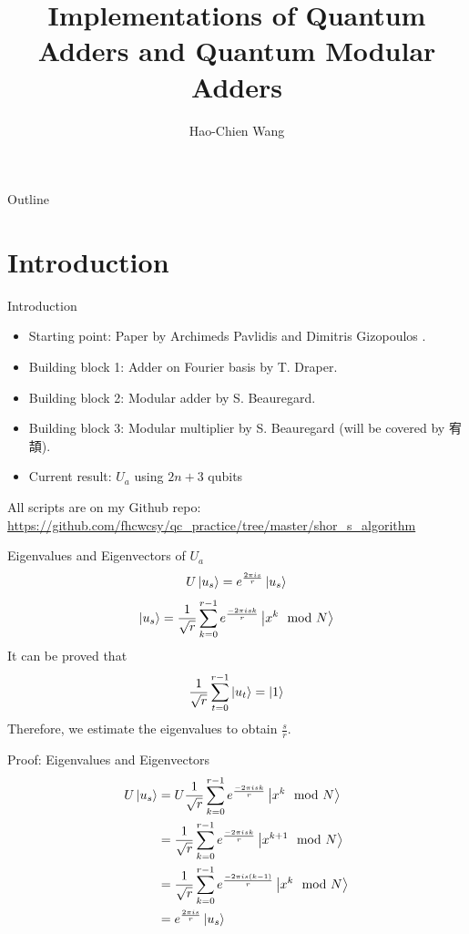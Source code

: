 \documentclass{beamer}
\title[Quantum Adder and Modular Adder]{Implementations of Quantum Adders and Quantum Modular Adders}
\author{Hao-Chien Wang}
\institute[NTUPhys]{Department of Physics, National Taiwan University}
\begin{document}
\begin{frame}
	\titlepage
\end{frame}

\begin{frame}{Outline}
	\tableofcontents
\end{frame}

\section{Introduction}%
\label{sec:introduction}

\begin{frame}{Introduction}
	\begin{itemize}
		\item Starting point: Paper by Archimeds Pavlidis and Dimitris Gizopoulos
			\cite{pavlidis}.
		\item Building block 1: Adder on Fourier basis by T. Draper\cite{draper}.
		\item Building block 2: Modular adder by S. Beauregard\cite{beauregard}.
		\item Building block 3: Modular multiplier by S. Beauregard\cite{beauregard} (will be covered by 宥頡).
		\item Current result: $U_a$ using $2n+3$ qubits
	\end{itemize}
	All scripts are on my Github repo: \\
	\scriptsize{\url{https://github.com/fhcwcsy/qc_practice/tree/master/shor_s_algorithm}}
\end{frame}


\begin{frame}{Eigenvalues and Eigenvectors of $U_a$}
	\begin{equation*}
		U \ket{u_s} = e^{\frac{2\pi i s}{r}} \ket{u_s}
	\end{equation*}
	\begin{equation*}
		\ket{u_s} = \frac{1}{\sqrt{r}} \sum_{k=0}^{r-1} 
		e^{\frac{-2\pi i sk}{r}} \ket{x^k \mod N}
	\end{equation*}
	It can be proved that
	\begin{equation*}
		\frac{1}{\sqrt{r}} \sum_{t=0}^{r-1} \ket{u_t} = \ket{1}
	\end{equation*}
	Therefore, we estimate the eigenvalues to obtain $\frac{s}{r}$.
\end{frame}

\begin{frame}{Proof: Eigenvalues and Eigenvectors}
	\begin{align*}
		U \ket{u_s} &= U \frac{1}{\sqrt{r}} \sum_{k=0}^{r-1} e^{\frac{-2\pi i sk}{r}} 
		\ket{x^k \mod N}\\
		&= \frac{1}{\sqrt{r}} \sum_{k=0}^{r-1} e^{\frac{-2\pi i sk}{r}} 
		\ket{x^{k+1} \mod N}\\
		&= \frac{1}{\sqrt{r}} \sum_{k=0}^{r-1} e^{\frac{-2\pi i s(k-1)}{r}} 
		\ket{x^k \mod N}\\
		&= e^{\frac{2 \pi is}{r}} \ket{u_s}
	\end{align*}
\end{frame}
\end{document}
